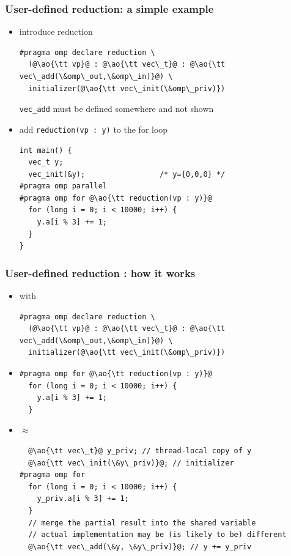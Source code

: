 \documentclass[12pt,dvipdfmx]{beamer}
\newcommand{\ao}[1]{{\color{blue}#1}}
\begin{document}
\begin{frame}[fragile]
\frametitle{User-defined reduction: a simple example}
\begin{itemize}
\item introduce reduction
\begin{lstlisting}
#pragma omp declare reduction \
  (@\ao{\tt vp}@ : @\ao{\tt vec\_t}@ : @\ao{\tt vec\_add(\&omp\_out,\&omp\_in)}@) \
  initializer(@\ao{\tt vec\_init(\&omp\_priv)})
\end{lstlisting}

{\tt vec\_add} must be defined somewhere and not shown

\item add {\tt reduction(vp : y)} to the for loop
\begin{lstlisting}
int main() {
  vec_t y;
  vec_init(&y);                 /* y={0,0,0} */
#pragma omp parallel
#pragma omp for @\ao{\tt reduction(vp : y)}@
  for (long i = 0; i < 10000; i++) {
    y.a[i % 3] += 1;
  }
}
\end{lstlisting}
\end{itemize}
\end{frame}

\begin{frame}[fragile]
  \frametitle{User-defined reduction : how it works}
  \begin{itemize}
  \item [] with
\begin{lstlisting}
#pragma omp declare reduction \
  (@\ao{\tt vp}@ : @\ao{\tt vec\_t}@ : @\ao{\tt vec\_add(\&omp\_out,\&omp\_in)}@) \
  initializer(@\ao{\tt vec\_init(\&omp\_priv)})
\end{lstlisting}
    
  \item []
\begin{lstlisting}
#pragma omp for @\ao{\tt reduction(vp : y)}@
  for (long i = 0; i < 10000; i++) {
    y.a[i % 3] += 1;
  }
\end{lstlisting}
\item []$\approx$
\begin{lstlisting}
  @\ao{\tt vec\_t}@ y_priv; // thread-local copy of y
  @\ao{\tt vec\_init(\&y\_priv)}@; // initializer
#pragma omp for
  for (long i = 0; i < 10000; i++) {
    y_priv.a[i % 3] += 1;
  }
  // merge the partial result into the shared variable
  // actual implementation may be (is likely to be) different
  @\ao{\tt vec\_add(\&y, \&y\_priv)}@; // y += y_priv
\end{lstlisting}
\end{itemize}
\end{frame}
\end{document}
